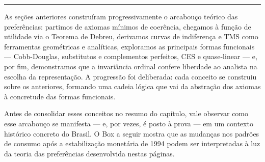 \documentclass[11pt,twoside,openright]{book}
\begin{document}
\begin{center}\rule{0.5\linewidth}{0.5pt}\end{center}

As seções anteriores construíram progressivamente o arcabouço teórico
das preferências: partimos de axiomas mínimos de coerência, chegamos à
função de utilidade via o Teorema de Debreu, derivamos curvas de
indiferença e TMS como ferramentas geométricas e analíticas, exploramos
as principais formas funcionais --- Cobb-Douglas, substitutos e
complementos perfeitos, CES e quase-linear --- e, por fim, demonstramos
que a invariância ordinal confere liberdade ao analista na escolha da
representação. A progressão foi deliberada: cada conceito se construiu
sobre os anteriores, formando uma cadeia lógica que vai da abstração dos
axiomas à concretude das formas funcionais.

Antes de consolidar esses conceitos no resumo do capítulo, vale observar
como esse arcabouço se manifesta --- e, por vezes, é posto à prova ---
em um contexto histórico concreto do Brasil. O Box a seguir mostra que
as mudanças nos padrões de consumo após a estabilização monetária de
1994 podem ser interpretadas à luz da teoria das preferências
desenvolvida nestas páginas.
\end{document}
